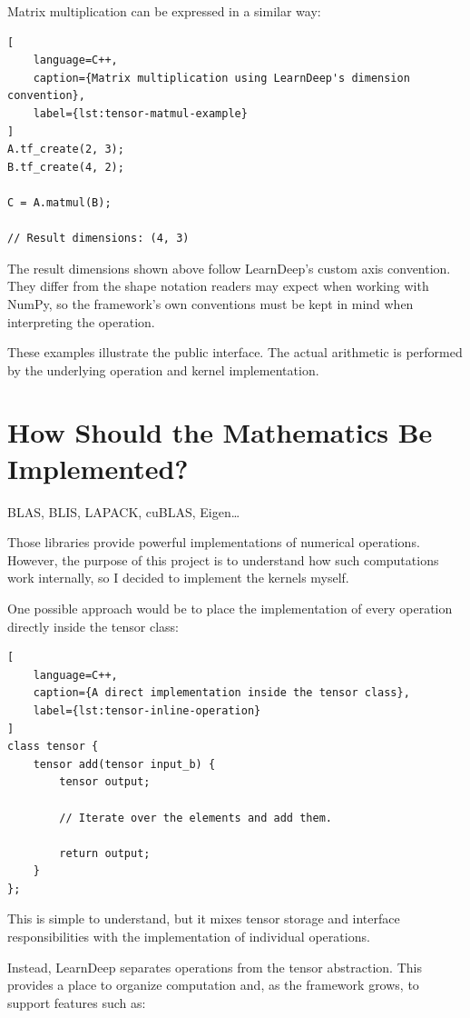 Matrix multiplication can be expressed in a similar way:

\begin{lstlisting}[
    language=C++,
    caption={Matrix multiplication using LearnDeep's dimension convention},
    label={lst:tensor-matmul-example}
]
A.tf_create(2, 3);
B.tf_create(4, 2);

C = A.matmul(B);

// Result dimensions: (4, 3)
\end{lstlisting}

The result dimensions shown above follow LearnDeep's custom axis convention. They differ from the shape notation readers may expect when working with NumPy, so the framework's own conventions must be kept in mind when interpreting the operation.

These examples illustrate the public interface. The actual arithmetic is performed by the underlying operation and kernel implementation.

\section{How Should the Mathematics Be Implemented?}

BLAS, BLIS, LAPACK, cuBLAS, Eigen\ldots

Those libraries provide powerful implementations of numerical operations. However, the purpose of this project is to understand how such computations work internally, so I decided to implement the kernels myself.

One possible approach would be to place the implementation of every operation directly inside the tensor class:

\begin{lstlisting}[
    language=C++,
    caption={A direct implementation inside the tensor class},
    label={lst:tensor-inline-operation}
]
class tensor {
    tensor add(tensor input_b) {
        tensor output;

        // Iterate over the elements and add them.

        return output;
    }
};
\end{lstlisting}

This is simple to understand, but it mixes tensor storage and interface responsibilities with the implementation of individual operations.

Instead, LearnDeep separates operations from the tensor abstraction. This provides a place to organize computation and, as the framework grows, to support features such as:

